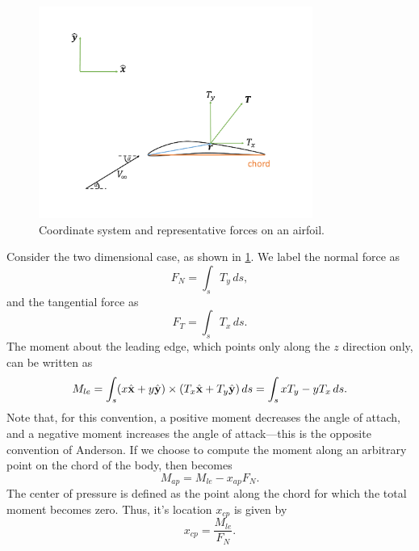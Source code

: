 \documentclass[oneside,a4paper,11pt]{report}
\begin{document}
\begin{figure}[ht]
   \centering
   \includegraphics[width=0.8\textwidth]{../../../images/airfoil.pdf}
   \caption{Coordinate system and representative forces on an airfoil.}
   \label{fig:airfoil}
\end{figure}

Consider the two dimensional case, as shown in \cref{fig:airfoil}. We label the normal force as
\begin{equation}
    F_N = \int_s T_y \, ds,
\end{equation}
and the tangential force as
\begin{equation}
    F_T = \int_s T_x \, ds.
\end{equation}
The moment about the leading edge, which points only along the $z$ direction only, can be written as
\begin{equation}
    M_{le} = \int_s (x \hat{\mathbf{x}} + y \hat{\mathbf{y}} ) \times (T_x \hat{\mathbf{x}} + T_y \hat{\mathbf{y}}) \, ds = \int_s x T_y - y T_x \, ds.
\end{equation}
Note that, for this convention, a positive moment decreases the angle of attach, and a negative moment increases the angle of attack---this is the opposite convention of Anderson. If we choose to compute the moment along an arbitrary point on the chord of the body, then  becomes
\begin{equation}
    M_{ap} = M_{le} - x_{ap} F_N.
\end{equation}
The center of pressure is defined as the point along the chord for which the total moment becomes zero. Thus, it's location $x_{cp}$ is given by
\begin{equation}
    x_{cp} = \frac{M_{le}}{F_N}.
\end{equation}
\end{document}

